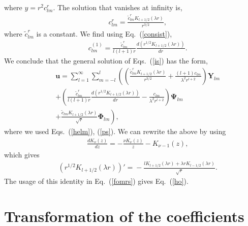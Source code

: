 \documentclass[aps,prx,twocolumn,amsmath,amssymb,amsfonts]{revtex4-2}
\begin{document}
{{\begin{appendices}
where $y=r^2c^r_{lm}$. The solution that vanishes at infinity is,
\begin{eqnarray}&&\!\!\!\!\!\!\!\!\!\!\!\!
c^r_{lm}=\frac{{\tilde c}^{r}_{lm} K_{l+1/2}(\lambda r)}{r^{3/2}},
\end{eqnarray}
where ${\tilde c}^{r}_{lm}$ is a constant. We find using Eq.~(\ref{consist}),
\begin{eqnarray}&&\!\!\!\!\!\!\!\!\!\!\!\!
c^{(1)}_{lm}
=\frac{{\tilde c}^{r}_{lm} }{l(l+1)r}\frac{d\left(r^{1/2}K_{l+1/2}(\lambda r)\right)}{dr}.
\end{eqnarray}
We conclude that the general solution of Eqs.~(\ref{is}) has the form,
\begin{eqnarray}&&\!\!\!\!\!\!\!\!\!\!\!\!
\bm u\!=\!\sum_{l=1}^{\infty}\sum_{m=-l}^l \left(\left(\frac{{\tilde c}^{r}_{lm} K_{l+1/2}(\lambda r)}{r^{3/2}}+\frac{(l+1)c_{lm}}{\lambda^2 r^{l+2}}\right)\bm Y_{lm}
\right.\nonumber\\&&\!\!\!\!\!\!\!\!\!\!\!\!\left.
+\!\left(\frac{{\tilde c}^{r}_{lm} }{l(l+1)r}\frac{d\left(r^{1/2}K_{l+1/2}(\lambda r)\right)}{dr}
-\frac{c_{lm}}{\lambda^2 r^{l+2}}\right)\bm \Psi_{lm}
\right.\nonumber\\&&\!\!\!\!\!\!\!\!\!\!\!\!\left.
+\frac{{\tilde c}_{lm} K_{l+1/2}(\lambda r)}{\sqrt{r}}\bm \Phi_{lm}\right), \label{fomrs}
\end{eqnarray}
where we used Eqs.~(\ref{helm}), (\ref{ps}). We can rewrite the above by using
\begin{eqnarray}&&
\frac{dK_{\nu}(z)}{dz}=-\frac{\nu K_{\nu}(z)}{z}-K_{\nu-1}(z), \nonumber
\end{eqnarray}
which gives
\begin{eqnarray}&&\!\!\!\!\!\!\!\!\!\!\!\!
\left(r^{1/2}K_{l+1/2}(\lambda r)\right)'\!=\!-\frac{l K_{l+1/2}(\lambda r)\!+\!\lambda r K_{l-1/2}(\lambda r)}{\sqrt{r}}
.\nonumber
\end{eqnarray}
The usage of this identity in Eq.~(\ref{fomrs}) gives Eq.~(\ref{ho}).

\section{Transformation of the coefficients} \label{transformation}


\end{appendices}}}
\end{document}
